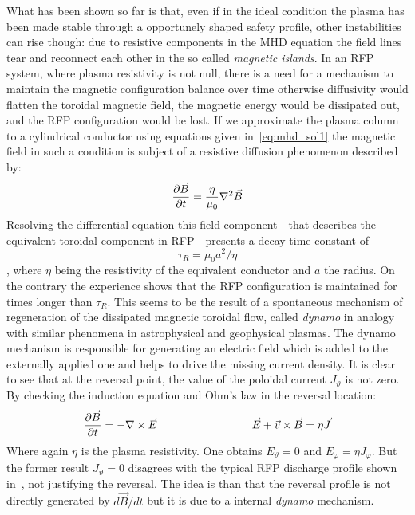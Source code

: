 What has been shown so far is that, even if in the ideal condition the plasma has been made stable through a opportunely shaped safety profile, other instabilities can rise though: due to resistive components in the MHD equation the field lines tear and reconnect each other in the so called \textit{magnetic islands}.
In an RFP system, where plasma resistivity is not null, there is a need for a mechanism to maintain the magnetic configuration balance over time otherwise diffusivity would flatten the toroidal magnetic field, the magnetic energy would be dissipated out, and the RFP configuration would be lost.
If we approximate the plasma column to a cylindrical conductor using equations given in~\eqref{eq:mhd_sol1} the magnetic field in such a condition is subject of a resistive diffusion phenomenon described by:
\begin{equation}
    \pdv{\Vec{B}}{t} = \frac{\eta}{\mu_0} \nabla^2 \Vec{B}
\end{equation}
Resolving the differential equation this field component - that describes the equivalent toroidal component in RFP - presents a decay time constant of $$\tau_R = \mu_0 a^2 / \eta$$, where $\eta$ being the resistivity of the equivalent conductor and $a$ the radius.
On the contrary the experience shows that the RFP configuration is maintained for times longer than $\tau_R$. This seems to be the result of a spontaneous mechanism of regeneration of the dissipated magnetic toroidal flow, called \textit{dynamo} in analogy with similar phenomena in astrophysical and geophysical plasmas. The dynamo mechanism is responsible for generating an electric field which is added to the externally applied one and helps to drive the missing current density. 
It is clear to see that at the reversal point, the value of the poloidal current $J_\vartheta$ is not zero. By checking the induction equation and Ohm’s law in the reversal location:
\begin{equation*}
    \pdv{\Vec{B}}{t} = - \nabla \times \Vec{E}  \hspace{3cm} \Vec{E} + \Vec{v} \times \Vec{B} = \eta \Vec{J}
    \label{eq:ohm_dynamo}
\end{equation*}
Where again $\eta$ is the plasma resistivity. One obtains $E_\vartheta = 0$ and $E_\varphi = \eta J_\varphi$. But the former
result $J_\vartheta = 0$ disagrees with the typical RFP discharge profile shown in~\Figure{\ref{fig:intro_safety_factor_profiles}}, not justifying the reversal.
The idea is than that the reversal profile is not directly generated by $d\Vec{B}/dt$ but it is due to a internal \textit{dynamo} mechanism.

